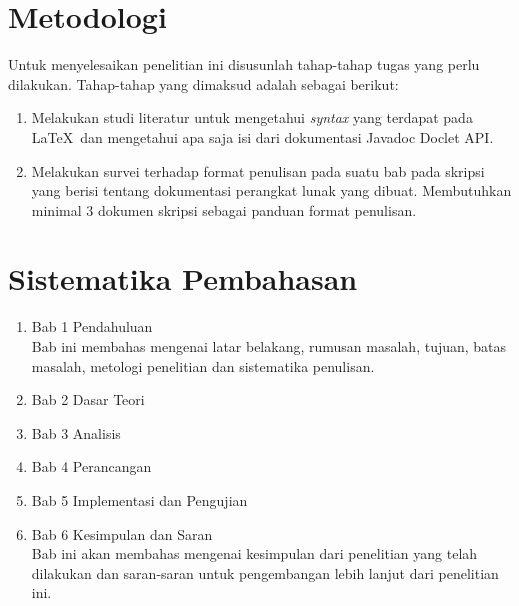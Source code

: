 \section{Metodologi}
\label{sec:metlit}
Untuk menyelesaikan penelitian ini disusunlah tahap-tahap tugas yang perlu dilakukan. Tahap-tahap yang dimaksud adalah sebagai berikut:
\begin{enumerate}
	\item Melakukan studi literatur untuk mengetahui {\it syntax} yang terdapat pada \LaTeX\ dan mengetahui apa saja isi dari dokumentasi Javadoc Doclet API.
	\item Melakukan survei terhadap format penulisan pada suatu bab pada skripsi yang berisi tentang dokumentasi perangkat lunak yang dibuat. Membutuhkan minimal 3 dokumen skripsi sebagai panduan format penulisan.
\end{enumerate}

\section{Sistematika Pembahasan}
\label{sec:sispem}
\begin{enumerate}
	\item Bab 1 Pendahuluan\\
	Bab ini membahas mengenai latar belakang, rumusan masalah, tujuan, batas masalah, metologi penelitian dan sistematika penulisan.
	\item Bab 2 Dasar Teori
	\item Bab 3 Analisis
	\item Bab 4 Perancangan
	\item Bab 5 Implementasi dan Pengujian
	\item Bab 6 Kesimpulan dan Saran\\
	Bab ini akan membahas mengenai kesimpulan dari penelitian yang telah dilakukan dan saran-saran untuk pengembangan lebih lanjut dari penelitian ini.
\end{enumerate}
















